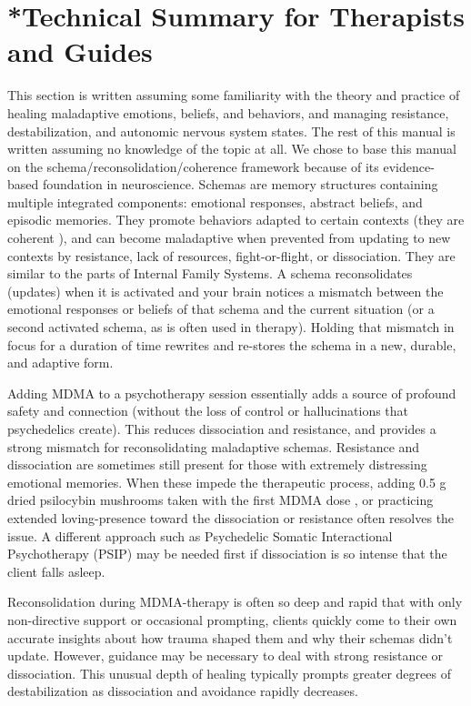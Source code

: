 \documentclass[12pt,letterpaper]{article}
\begin{document}
\section{*Technical Summary for Therapists and Guides}
This section is written assuming some familiarity with the theory and practice of healing maladaptive emotions, beliefs, and behaviors, and managing resistance, destabilization, and autonomic nervous system states. The rest of this manual is written assuming no knowledge of the topic at all. We chose to base this manual on the schema/reconsolidation/coherence framework because of its evidence-based foundation in neuroscience. Schemas are memory structures containing multiple integrated components: emotional responses, abstract beliefs, and episodic memories. They promote behaviors adapted to certain contexts (they are coherent ), and can become maladaptive when prevented from updating to new contexts by resistance, lack of resources, fight-or-flight, or dissociation. They are similar to the parts of Internal Family Systems. A schema reconsolidates (updates) when it is activated and your brain notices a mismatch between the emotional responses or beliefs of that schema and the current situation (or a second activated schema, as is often used in therapy). Holding that mismatch in focus for a duration of time rewrites and re-stores the schema in a new, durable, and adaptive form.

Adding MDMA to a psychotherapy session essentially adds a source of profound safety and connection (without the loss of control or hallucinations that psychedelics create). This reduces dissociation and resistance, and provides a strong mismatch for reconsolidating maladaptive schemas.  Resistance and dissociation are sometimes still present for those with extremely distressing emotional memories. When these impede the therapeutic process, adding 0.5 g dried psilocybin mushrooms taken with the first MDMA dose , or practicing extended loving-presence toward the dissociation or resistance often resolves the issue. A different approach such as Psychedelic Somatic Interactional Psychotherapy (PSIP) may be needed first if dissociation is so intense that the client falls asleep.

Reconsolidation during MDMA-therapy is often so deep and rapid that with only non-directive support or occasional prompting, clients quickly come to their own accurate insights about how trauma shaped them and why their schemas didn't update. However, guidance may be necessary to deal with strong resistance or dissociation. This unusual depth of healing typically prompts greater degrees of destabilization as dissociation and avoidance rapidly decreases.
\end{document}
